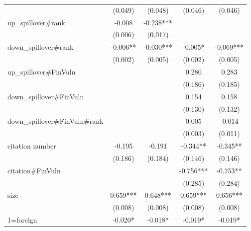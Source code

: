 \documentclass[12pt]{article}%
\begin{document}
\begin{CJK*}{GBK}{fs}
\begin{table}[!h]
{{{\begin{tabular}{l*{4}{c}}
           &    (0.049) &    (0.048) &    (0.046) &    (0.046) \\

up\_spillover\#rank &     -0.008 &  -0.238*** &            &            \\

           &    (0.006) &    (0.017) &            &            \\

down\_spillover\#rank &   -0.006** &  -0.030*** &    -0.005* &  -0.069*** \\

           &    (0.002) &    (0.005) &    (0.002) &    (0.005) \\

up\_spillover\#FinVuln &            &            &      0.280 &      0.283 \\

           &            &            &    (0.186) &    (0.185) \\

down\_spillover\#FinVuln &            &            &      0.154 &      0.158 \\

           &            &            &    (0.130) &    (0.132) \\
down\_spillover\#FinVuln\#rank &            &            &      0.005 &     -0.014 \\

           &            &            &    (0.003) &    (0.011) \\
citation number &     -0.195 &     -0.191 &   -0.344** &   -0.345** \\

           &    (0.186) &    (0.184) &    (0.146) &    (0.146) \\

citation\#FinVuln &            &            &  -0.756*** &   -0.753** \\

           &            &            &    (0.285) &    (0.284) \\



      size &   0.659*** &   0.648*** &   0.659*** &   0.656*** \\

           &    (0.008) &    (0.008) &    (0.008) &    (0.008) \\

 1=foreign &    -0.020* &    -0.018* &    -0.019* &    -0.019* \\


\end{tabular}}}}
\end{table}
\end{CJK*}
\end{document}
